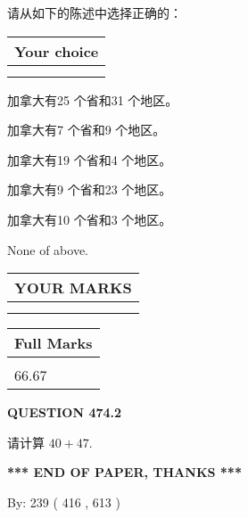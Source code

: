 \documentclass{ctexart}
\begin{document}
  
请从如下的陈述中选择正确的：
  
  
\noindent\hspace{3.0in} \begin{tabular}{|l|}
\hline
Your choice \\
\hline
 \\ 
 \\ 
\hline
\end{tabular}
  
  
 
 
加拿大有25 个省和31 个地区。
 
 
加拿大有7 个省和9 个地区。
 
 
加拿大有19 个省和4 个地区。
 
 
加拿大有9 个省和23 个地区。
 
 
加拿大有10 个省和3 个地区。
 
 
 None of above.
 
 
  
\vspace{0.2in}
  
\noindent\begin{tabular}{|l|}
\hline
 YOUR MARKS  \\
\hline
 \\ 
 \\ 
\hline
\end{tabular}
\hspace{0.05in} \begin{tabular}{|l|}
\hline
 Full Marks  \\
\hline
 \\ 
66.67 \\
\hline
\end{tabular}
{\textbf{\Large{QUESTION
474.2 
}}}
  
  
 
请计算 $ %
40 +  %
47 $.
 

 

 
   
   
 \vspace{0.2in}
 
   
   
   
   
\vspace{1.0in} 
{\textbf{\large{ *** END OF PAPER, THANKS *** }}} 
   
   
\hspace{1.0in} By: 
 239 ( 416 ,  613 )
   
\end{document}
